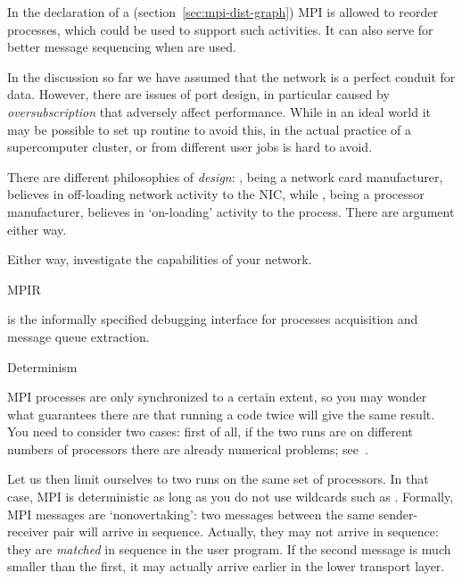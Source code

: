 In the declaration of a 
  (section~\ref{sec:mpi-dist-graph}) MPI is allowed to
reorder processes, which could be used to support such activities.
It can also serve for better message sequencing when
 are used.


In the discussion so far we have assumed that the network is a perfect
conduit for data. However, there are issues of port design, in
particular caused by
\emph{oversubscription} that
adversely affect performance. While in an ideal world it may be
possible to set up routine to avoid this, in the actual practice of a
supercomputer cluster,  or
 from
different user jobs is hard to avoid.


There are different philosophies of 
\emph{design}: , being a network card manufacturer,
believes in off-loading network activity to the \ac{NIC}, while
, being a processor manufacturer, believes in
`on-loading' activity to the process. There are argument either way.

Either way, investigate the capabilities of your network.

 {MPIR}

 is the informally specified debugging interface
for processes acquisition and message queue extraction.

 {Determinism}
\label{sec:mpi-semantics}

MPI processes are only synchronized to a certain extent, so you may
wonder what guarantees there are that running a code twice will give
the same result.  You need to consider two cases: first of all, if the
two runs are on different numbers of processors there are already
numerical problems; see~.

Let us then limit ourselves to two runs on the same set of processors. 
In that case, MPI is deterministic as long as you do not use 
wildcards such as . Formally, 
MPI messages are `nonovertaking': two messages between the same
sender-receiver pair will arrive in sequence.
Actually, they may not arrive in sequence: they are \emph{matched}
in sequence in the user program. If the second message is much smaller than the first,
it may actually arrive earlier in the lower transport layer.

